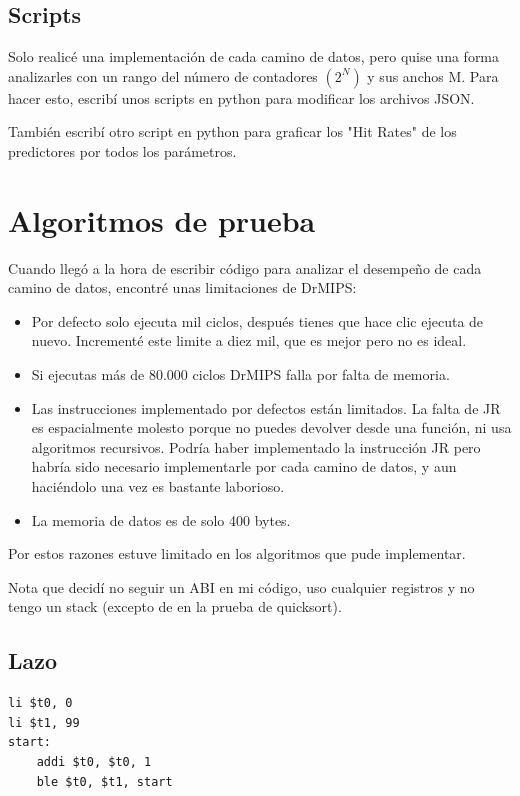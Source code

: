 \documentclass[a4paper]{article}
\begin{document}
\subsection{Scripts}

Solo realicé una implementación de cada camino de datos, pero quise una forma analizarles con un rango del número de contadores $(2^N)$ y sus anchos M. Para hacer esto, escribí unos scripts en python para modificar los archivos JSON.

También escribí otro script en python para graficar los "Hit Rates" de los predictores por todos los parámetros.

\section{Algoritmos de prueba}

Cuando llegó a la hora de escribir código para analizar el desempeño de cada camino de datos, encontré unas limitaciones de DrMIPS:

\begin{itemize}
    \item Por defecto solo ejecuta mil ciclos, después tienes que hace clic ejecuta de nuevo. Incrementé este limite a diez mil, que es mejor pero no es ideal.
    \item Si ejecutas más de 80.000 ciclos DrMIPS falla por falta de memoria.
    \item Las instrucciones implementado por defectos están limitados. La falta de JR es espacialmente molesto porque no puedes devolver desde una función, ni usa algoritmos recursivos. Podría haber implementado la instrucción JR pero habría sido necesario implementarle por cada camino de datos, y aun haciéndolo una vez es bastante laborioso.
    \item La memoria de datos es de solo 400 bytes.
\end{itemize}

Por estos razones estuve limitado en los algoritmos que pude implementar.

Nota que decidí no seguir un ABI en mi código, uso cualquier registros y no tengo un stack (excepto de en la prueba de quicksort).

\subsection{Lazo}

\begin{verbatim}
li $t0, 0
li $t1, 99
start:
	addi $t0, $t0, 1
	ble $t0, $t1, start
\end{verbatim}
\end{document}
